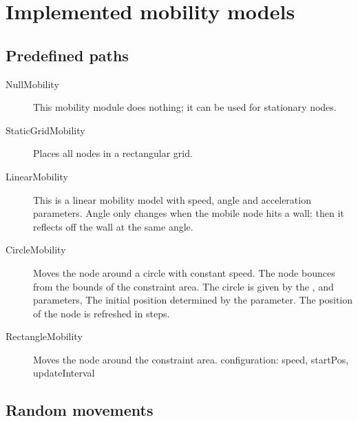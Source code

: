 \section{Implemented mobility models}

\subsection{Predefined paths}

\begin{description}

\item[NullMobility] This mobility module does nothing;
it can be used for stationary nodes.

\item[StaticGridMobility] Places all nodes in a rectangular grid.


\item[LinearMobility] This is a linear mobility model with speed,
angle and acceleration parameters. Angle only changes when the mobile
node hits a wall: then it reflects off the wall at the same angle.


\item[CircleMobility] Moves the node around a circle with constant speed.
The node bounces from the bounds of the constraint area.
The circle is given by the ,  and  parameters,
The initial position determined by the  parameter.
The position of the node is refreshed in  steps.


\item[RectangleMobility] Moves the node around the constraint area.
configuration: speed, startPos, updateInterval

\end{description}

\subsection{Random movements}

